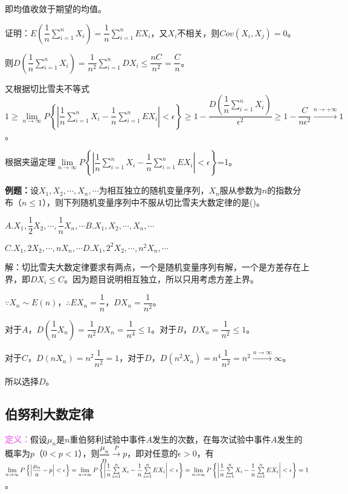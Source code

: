 \documentclass[UTF8, 12pt]{ctexart}
\begin{document}
即均值收敛于期望的均值。

证明：$E\left(\dfrac{1}{n}\sum\limits_{i=1}^nX_i\right)=\dfrac{1}{n}\sum\limits_{i=1}^nEX_i$，又$X_i$不相关，则$Cov(X_i,X_j)=0$。

则$D\left(\dfrac{1}{n}\sum\limits_{i=1}^nX_i\right)=\dfrac{1}{n^2}\sum\limits_{i=1}^nDX_i\leqslant\dfrac{nC}{n^2}=\dfrac{C}{n}$。

又根据切比雪夫不等式$1\geqslant\lim\limits_{n\to\infty}P\left\{\left\vert\dfrac{1}{n}\sum\limits_{i=1}^nX_i-\dfrac{1}{n}\sum\limits_{i=1}^nEX_i\right\vert<\epsilon\right\}\geqslant1-\dfrac{D\left(\dfrac{1}{n}\sum_{i=1}^nX_i\right)}{\epsilon^2}\geqslant1-\dfrac{C}{n\epsilon^2}\xrightarrow{n\to+\infty}1$。

根据夹逼定理$\lim\limits_{n\to\infty}P\left\{\left\vert\dfrac{1}{n}\sum\limits_{i=1}^nX_i-\dfrac{1}{n}\sum\limits_{i=1}^nEX_i\right\vert<\epsilon\right\}$=1。

\textbf{例题：}设$X_1,X_2,\cdots,X_n,\cdots$为相互独立的随机变量序列，$X_n$服从参数为$n$的指数分布（$n\leqslant1$），则下列随机变量序列中不服从切比雪夫大数定律的是()。

$A.X_1,\dfrac{1}{2}X_2,\cdots,\dfrac{1}{n}X_n,\cdots$\qquad$B.X_1,X_2,\cdots,X_n,\cdots$

$C.X_1,2X_2,\cdots,nX_n,\cdots$\qquad$D.X_1,2^2X_2,\cdots,n^2X_n,\cdots$

解：切比雪夫大数定律要求有两点，一个是随机变量序列有解，一个是方差存在上界，即$DX_i\leqslant C$。因为题目说明相互独立，所以只用考虑方差上界。

$\because X_n\sim E(n)$，$\therefore EX_n=\dfrac{1}{n}$，$DX_n=\dfrac{1}{n^2}$。

对于$A$，$D\left(\dfrac{1}{n}X_n\right)=\dfrac{1}{n^2}DX_n=\dfrac{1}{n^4}\leqslant1$。对于$B$，$DX_n=\dfrac{1}{n^2}\leqslant1$。

对于$C$，$D(nX_n)=n^2\dfrac{1}{n^2}=1$，对于$D$，$D(n^2X_n)=n^4\dfrac{1}{n^2}=n^2\overset{n\to\infty}{\longrightarrow}\infty$。

所以选择$D$。

\subsection{伯努利大数定律}

\textcolor{violet}{\textbf{定义：}}假设$\mu_n$是$n$重伯努利试验中事件$A$发生的次数，在每次试验中事件$A$发生的概率为$p$（$0<p<1$），则$\dfrac{\mu_n}{n}\overset{P}{\longrightarrow}p$，即对任意的$\epsilon>0$，有$\lim\limits_{n\to\infty}P\left\{\left\vert\dfrac{\mu_n}{n}-p\right\vert<\epsilon\right\}=\lim\limits_{n\to\infty}P\left\{\left\vert\dfrac{1}{n}\sum\limits_{i=1}^nX_i-\dfrac{1}{n}\sum\limits_{i=1}^nEX_i\right\vert<\epsilon\right\}=\lim\limits_{n\to\infty}P\\\left\{\left\vert\dfrac{1}{n}\sum\limits_{i=1}^nX_i-\dfrac{1}{n}\sum\limits_{i=1}^nEX_i\right\vert<\epsilon\right\}=1$。
\end{document}
